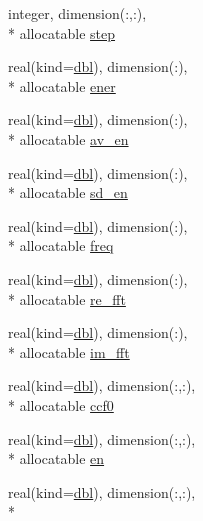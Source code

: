 \begin{DoxyCompactItemize}
\item 
integer, dimension(\+:,\+:), \\*
allocatable \hyperlink{classcorr__pdf__av__en_af7228710cff0435d673df814f2730bc6}{step}
\item 
real(kind=\hyperlink{classcorr__pdf__av__en_a411e74f2fd514aedb12054b21e1d7c58}{dbl}), dimension(\+:), \\*
allocatable \hyperlink{classcorr__pdf__av__en_a61ffc857d0af4035f445b991729edbb4}{ener}
\item 
real(kind=\hyperlink{classcorr__pdf__av__en_a411e74f2fd514aedb12054b21e1d7c58}{dbl}), dimension(\+:), \\*
allocatable \hyperlink{classcorr__pdf__av__en_a8b0559d7361208f6f73d4bfca51bbafc}{av\+\_\+en}
\item 
real(kind=\hyperlink{classcorr__pdf__av__en_a411e74f2fd514aedb12054b21e1d7c58}{dbl}), dimension(\+:), \\*
allocatable \hyperlink{classcorr__pdf__av__en_ad6852462582e935a9b01ca0b6929a235}{sd\+\_\+en}
\item 
real(kind=\hyperlink{classcorr__pdf__av__en_a411e74f2fd514aedb12054b21e1d7c58}{dbl}), dimension(\+:), \\*
allocatable \hyperlink{classcorr__pdf__av__en_a6bfe60f479474ca924c3d7a26a30725b}{freq}
\item 
real(kind=\hyperlink{classcorr__pdf__av__en_a411e74f2fd514aedb12054b21e1d7c58}{dbl}), dimension(\+:), \\*
allocatable \hyperlink{classcorr__pdf__av__en_a103eb830c35d0f4221a6b1f9ef5f9e76}{re\+\_\+fft}
\item 
real(kind=\hyperlink{classcorr__pdf__av__en_a411e74f2fd514aedb12054b21e1d7c58}{dbl}), dimension(\+:), \\*
allocatable \hyperlink{classcorr__pdf__av__en_aa146e151c4b487b62759edfe51a71d9b}{im\+\_\+fft}
\item 
real(kind=\hyperlink{classcorr__pdf__av__en_a411e74f2fd514aedb12054b21e1d7c58}{dbl}), dimension(\+:,\+:), \\*
allocatable \hyperlink{classcorr__pdf__av__en_a7f6a1a47a3c3d9839341a7cf3f7e43d4}{ccf0}
\item 
real(kind=\hyperlink{classcorr__pdf__av__en_a411e74f2fd514aedb12054b21e1d7c58}{dbl}), dimension(\+:,\+:), \\*
allocatable \hyperlink{classcorr__pdf__av__en_ad7740ba8e54476232cb2633bb401fa5a}{en}
\item 
real(kind=\hyperlink{classcorr__pdf__av__en_a411e74f2fd514aedb12054b21e1d7c58}{dbl}), dimension(\+:,\+:), \\*

\end{DoxyCompactItemize}
